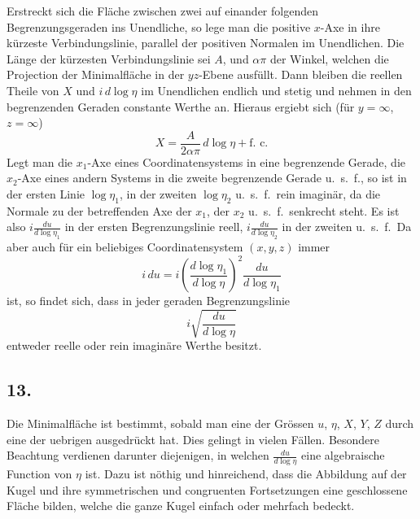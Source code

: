 \documentclass[12pt,a4paper]{article}
\begin{document}
Erstreckt sich die Fl\"ache zwischen zwei auf einander folgenden Begrenzungsgeraden ins Unendliche, so lege man die positive $x$-Axe in ihre k\"urzeste Verbindungslinie, parallel der positiven Normalen im Unendlichen. Die L\"ange der k\"urzesten Verbindungslinie sei $A$, und $\alpha\pi$ der Winkel, welchen die Projection der Minimalfl\"ache in der $yz$-Ebene ausf\"ullt. Dann bleiben die reellen Theile von $X$ und $i\, d\log\eta$ im Unendlichen endlich und stetig und nehmen in den begrenzenden Geraden constante Werthe an. Hieraus ergiebt sich (f\"ur $y=\infty$, $z=\infty$)
\[X = \frac{A}{2\alpha\pi}\, d\log\eta + \text{f.\ c.}\]
Legt man die $x_{1}$-Axe eines Coordinatensystems in eine begrenzende Gerade, die $x_{2}$-Axe eines andern Systems in die zweite begrenzende Gerade u.\ s.\ f., so ist in der ersten Linie $\log\eta_{1}$, in der zweiten $\log\eta_{2}$ u.\ s.\ f.\ rein imagin\"ar, da die Normale zu der betreffenden Axe der $x_{1}$, der $x_{2}$ u.\ s.\ f.\ senkrecht steht. Es ist also $i\frac{du}{d\log\eta_{1}}$ in der ersten Begrenzungslinie reell, $i\frac{du}{d\log\eta_{2}}$ in der zweiten u.\ s.\ f.\ Da aber auch f\"ur ein beliebiges Coordinatensystem $(x,y,z)$ immer
\[i\, du = i\left(\frac{d\log\eta_{1}}{d\log\eta}\right)^{2} \frac{du}{d\log\eta_{1}}\]
ist, so findet sich, dass in jeder geraden Begrenzungslinie
\[i\sqrt{\frac{du}{d\log\eta}}\]
entweder reelle oder rein imagin\"are Werthe besitzt.

\newpage
\subsection*{13.}

Die Minimalfl\"ache ist bestimmt, sobald man eine der Gr\"ossen $u$, $\eta$, $X$, $Y$, $Z$ durch eine der uebrigen ausgedr\"uckt hat. Dies gelingt in vielen F\"allen. Besondere Beachtung verdienen darunter diejenigen, in welchen $\frac{du}{d\log\eta}$ eine algebraische Function von $\eta$ ist. Dazu ist n\"othig und hinreichend, dass die Abbildung auf der Kugel und ihre symmetrischen und congruenten Fortsetzungen eine geschlossene Fl\"ache bilden, welche die ganze Kugel einfach oder mehrfach bedeckt.
\end{document}
